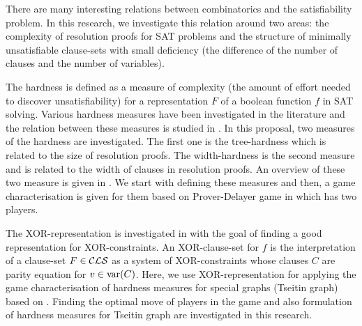 \documentclass{report}
\begin{document}
There are many interesting relations between combinatorics and the satisfiability problem. In this research, we investigate this relation around two areas: the complexity of resolution proofs for SAT problems and the structure of minimally unsatisfiable clause-sets with small deficiency (the difference of the number of clauses and the number of variables).

The hardness is defined as a measure of complexity (the amount of effort needed to discover unsatisfiability) for a representation $F$ of a boolean function $f$ in SAT solving. Various hardness measures have been investigated in the literature and the relation between these measures is studied in \cite{BeyersdorffGwynneKullmann2013PHPER,BeyersdorffKullmann2014PHP,GwynneKullmann2013GoodRepresentationsIIex}. In this proposal, two measures of the hardness are investigated. The first one is the tree-hardness which is related to the size of resolution proofs. The width-hardness is the second measure and is related to the width of clauses in resolution proofs. An overview of these two measure is given in \cite{BeyersdorffGwynneKullmann2013PHPER,BeyersdorffKullmann2014PHP, GwynneKullmann2012Slur}. We start with defining these measures and then, a game characterisation is given for them based on Prover-Delayer game in \cite{BeyersdorffKullmann2014PHP} which has two players.

The XOR-representation is investigated in \cite{GwynneKullmann2013GoodRepresentations,GwynneKullmann2013GoodRepresentationsIIex,GwynneKullmann2013GoodRepresentationsIILata} with the goal of finding a good representation for XOR-constraints. An XOR-clause-set for $f$ is the interpretation of a clause-set $F \in \mathcal{CLS}$ as a system of XOR-constraints whose clauses $C$ are parity equation for $v \in \operatorname{var}(C)$. Here, we use XOR-representation for applying the game characterisation of hardness measures for special graphs (Tseitin graph) based on \cite{GwynneKullmann2013GoodRepresentationsIIex,GwynneKullmann2013GoodRepresentationsIILata}. Finding the optimal move of players in the game and also formulation of hardness measures for Tseitin graph are investigated in this research.
\end{document}
